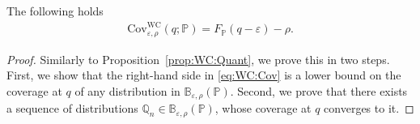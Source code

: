 \documentclass[11pt,a4paper]{article}
\begin{document}
\begin{proposition}
\label{prop:WC:Cov}
The following holds
\begin{align}
\label{eq:WC:Cov}
    \text{Cov}_{\varepsilon,\rho}^{\text{WC}}(q;\mathbb P) = F_{\mathbb P}(q - \varepsilon) - \rho.
\end{align}
\end{proposition}
\begin{proof}
Similarly to Proposition~\ref{prop:WC:Quant}, we prove this in two steps. First, we show that the right-hand side in \eqref{eq:WC:Cov} is a lower bound on the coverage at $q$ of any distribution in $\mathbb{B}_{\varepsilon, \rho}(\mathbb P)$. Second, we prove that there exists a sequence of distributions $\mathbb Q
_n \in \mathbb{B}_{\varepsilon, \rho}(\mathbb P)$, whose coverage at $q$ converges to it. 

\medskip


\end{proof}
\end{document}
